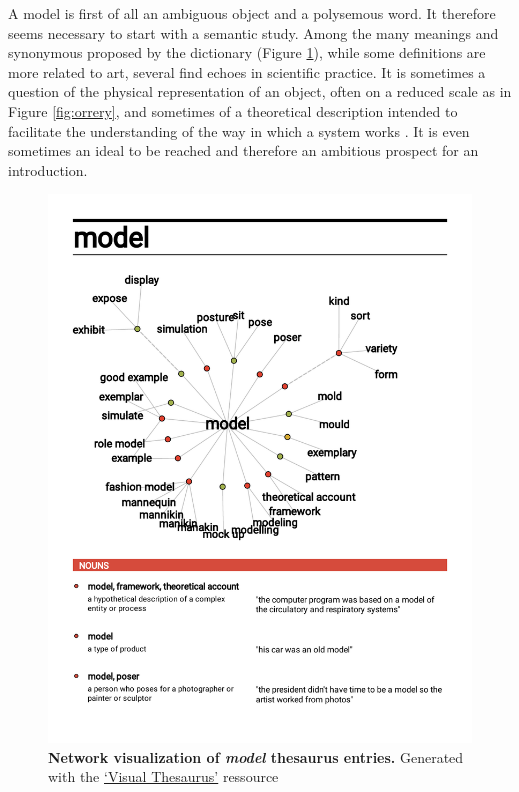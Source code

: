 \documentclass[a4paper,12pt,twoside,onecolumn,openright,final,oldfontcommands]{memoir}
\begin{document}
A model is first of all an ambiguous object and a polysemous word. It
therefore seems necessary to start with a semantic study. Among the many
meanings and synonymous proposed by the dictionary (Figure
\ref{fig:visual-thesaurus}), while some definitions are more related to
art, several find echoes in scientific practice. It is sometimes a
question of the physical representation of an object, often on a reduced
scale as in Figure \ref{fig:orrery}, and sometimes of a theoretical
description intended to facilitate the understanding of the way in which
a system works \citep{dictionnarymodel}. It is even sometimes an ideal
to be reached and therefore an ambitious prospect for an introduction.

\begin{figure}

{\centering \includegraphics[width=0.9\linewidth]{fig/visualThesaurus} 

}

\caption[Network visualization of \emph{model} thesaurus entries]{\textbf{Network visualization of
\emph{model} thesaurus entries.} Generated with the
\href{https://www.visualthesaurus.com}{`Visual Thesaurus'} ressource}\label{fig:visual-thesaurus}
\end{figure}
\end{document}
